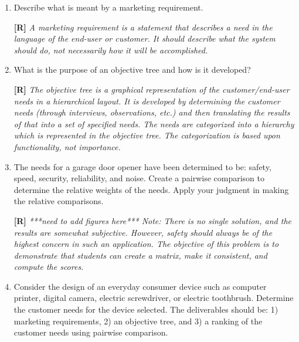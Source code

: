 \begin{enumerate}
\item
  Describe what is meant by a marketing requirement.

  \begin{onlysolution}
  \textbf{[R]}
  \itshape
  A marketing requirement is a statement that describes a need in the language 
  of the end-user or customer. It should describe what the system should do, not 
  necessarily how it will be accomplished.
  \end{onlysolution}

\item
  What is the purpose of an objective tree and how is it developed?
  
  \begin{onlysolution}
  \textbf{[R]}
  \itshape
  The objective tree is a graphical representation of the customer/end-user needs 
  in a hierarchical layout. It is developed by determining the customer needs 
  (through interviews, observations, etc.) and then translating the results of 
  that into a set of specified needs. The needs are categorized into a hierarchy 
  which is represented in the objective tree. The categorization is based upon 
  functionality, not importance.
  \end{onlysolution}

\item
  The needs for a garage door opener have been determined to be: safety,
  speed, security, reliability, and noise. Create a pairwise comparison
  to determine the relative weights of the needs. Apply your judgment in
  making the relative comparisons.
  
  \begin{onlysolution}
  \textbf{[R]}
  \itshape
  ***need to add figures here***
  \emph{Note:} There is no single solution, and the results are somewhat 
  subjective. However, safety should always be of the highest concern in 
  such an application. The objective of this problem is to demonstrate 
  that students can create a matrix, make it consistent, and compute the 
  scores.
  \end{onlysolution}

\item
  Consider the design of an everyday consumer device such as computer
  printer, digital camera, electric screwdriver, or electric toothbrush.
  Determine the customer needs for the device selected. The deliverables
  should be: 1) marketing requirements, 2) an objective tree, and 3) a
  ranking of the customer needs using pairwise comparison.
  

\end{enumerate}
